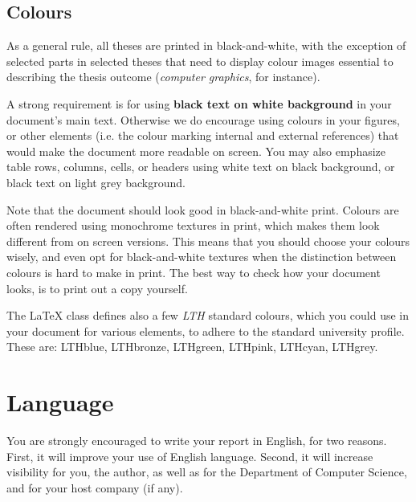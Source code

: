 \documentclass[nofilelist]{cslthse-msc}
\begin{document}
\begin{appendices}
 

\section{Colours}
As a general rule, all theses are printed in black-and-white, with the exception of selected parts in selected theses that need to display colour images essential to describing the thesis outcome (\textit{computer graphics}, for instance).

A strong requirement is for using \textbf{black text on white background} in your document's main text. Otherwise we do encourage using colours in your figures, or other elements (i.e. the colour marking internal and external references) that would make the document more readable on screen. You may also emphasize table rows, columns, cells, or headers using white text on black background, or black text on light grey background.

Note that the document should look good in black-and-white print. Colours are often rendered using monochrome textures in print, which makes them look different from on screen versions. This means that you should choose your colours wisely, and even opt for black-and-white textures when the distinction between colours is hard to make in print. The best way to check how your document looks, is to print out a copy yourself.

The {\LaTeX}  class defines also a few {\em LTH} standard colours, which you could use in your document for various elements, to adhere to the standard university profile. \\These are: {\color{LTHblue}LTHblue}, {\color{LTHbronze}LTHbronze}, {\color{LTHgreen}LTHgreen}, {\color{LTHpink}LTHpink}, {\color{LTHcyan}LTHcyan}, {\color{LTHgrey}LTHgrey}.

\chapter{Language}

You are strongly encouraged to write your report in English, for two reasons. First, it will improve your use of English language. Second, it will increase visibility for you, the author, as well as for the Department of Computer Science, and for your host company (if any).


\end{appendices}
\end{document}
